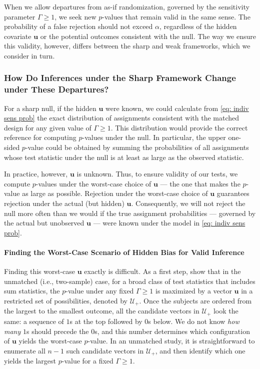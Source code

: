 \documentclass[twoside,11pt]{article}
\begin{document}
When we allow departures from as-if randomization, governed by the
sensitivity parameter \(\Gamma \geq 1\), we seek new \(p\)-values that
remain valid in the same sense. The probability of a false rejection
should not exceed \(\alpha\), regardless of the hidden covariate
\(\bm{u}\) or the potential outcomes consistent with the null. The
way we ensure this validity, however, differs between the sharp and weak
frameworks, which we consider in turn.

\subsubsection{How Do Inferences under the Sharp Framework Change under
These
Departures?}\label{how-do-inferences-under-the-sharp-framework-change-under-these-departures}

For a sharp null, if the hidden \(\bm{u}\) were known, we could
calculate from \eqref{eq: indiv sens prob} the exact distribution of
assignments consistent with the matched design for any given value of
\(\Gamma \geq 1\). This distribution would provide the correct reference
for computing \(p\)-values under the null. In particular, the upper
one-sided \(p\)-value could be obtained by summing the probabilities of
all assignments whose test statistic under the null is at least as large
as the observed statistic.

In practice, however, \(\bm{u}\) is unknown. Thus, to ensure validity of
our tests, we compute \(p\)-values under the worst-case choice of
\(\bm{u}\) --- the one that makes the \(p\)-value as large as possible.
Rejection under the worst-case choice of \(\bm{u}\) guarantees rejection
under the actual (but hidden) \(\bm{u}\). Consequently, we will not
reject the null more often than we would if the true assignment
probabilities --- governed by the actual but unobserved \(\bm{u}\) ---
were known under the model in \eqref{eq: indiv sens prob}.

\paragraph{Finding the Worst-Case Scenario of Hidden Bias for
Valid
Inference}\label{finding-the-worst-case-scenario-of-hidden-confounding-for-valid-inference}

Finding this worst-case \(\bm{u}\) exactly is difficult. As a first
step, \citet{rosenbaumkrieger1990} show that in the unmatched (i.e.,
two-sample) case, for a broad class of test statistics that includes sum
statistics, the \(p\)-value under
any fixed \(\Gamma \geq 1\) is maximized by a vector \(\bm{u}\) in a restricted set of
possibilities, denoted by \(\mathcal{U}_{+}\). Once the subjects are
ordered from the largest to the smallest outcome, all the candidate
vectors in \(\mathcal{U}_{+}\) look the same: a sequence of \(1\)s at
the top followed by \(0\)s below. We do not know \emph{how many} \(1\)s
should precede the \(0\)s, and this number determines which
configuration of \(\bm{u}\) yields the worst-case \(p\)-value. In an
unmatched study, it is straightforward to enumerate all \(n - 1\) such
candidate vectors in \(\mathcal{U}_+\), and then identify which one
yields the largest \(p\)-value for a fixed \(\Gamma \geq 1\).
\end{document}
